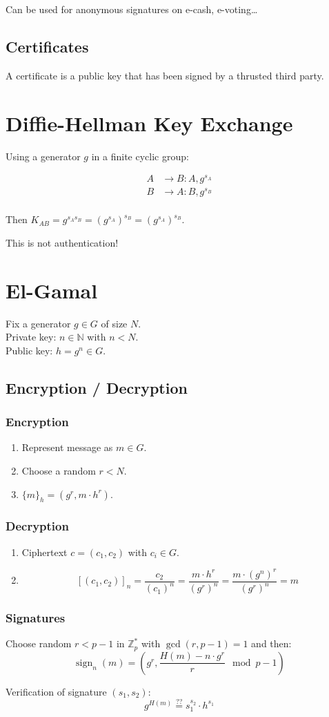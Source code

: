 \documentclass{article}
\newcommand{\ZZ}{\mathbb{Z}}
\newcommand{\Z}{\ZZ}
\begin{document}
Can be used for anonymous signatures on e-cash, e-voting\dots

\subsection{Certificates}
A certificate is a public key that has been signed by a thrusted third party.

\section{Diffie-Hellman Key Exchange}

Using a generator $g$ in a finite cyclic group:

\begin{align*}
  A &\longrightarrow B: A, g^{s_A} \\
  B &\longrightarrow A: B, g^{s_B} \\
\end{align*}

Then $K_{AB} = g^{s_A s_B} = (g^{s_A})^{s_B} = (g^{s_A})^{s_B}$.

This is not authentication!

\section{El-Gamal}
Fix a generator $g \in G$ of size $N$. \\
Private key: $n \in \mathbb{N}$ with $n < N$. \\
Public key: $h = g^n \in G$.

\subsection{Encryption / Decryption}
\subsubsection{Encryption}

\begin{enumerate}
  \item Represent message as $m \in G$.
  \item Choose a random $r < N$.
  \item $\{m\}_h = (g^r, m \cdot h^r)$.
\end{enumerate}

\subsubsection{Decryption}
\begin{enumerate}
  \item Ciphertext $c = (c_1,c_2)$ with $c_i \in G$.
  \item \[
      [(c_1, c_2)]_n = \frac{c_2}{(c_1)^n} = \frac{m \cdot h^r}{(g^r)^n} = \frac{m \cdot (g^n)^r}{(g^r)^n} = m
    \]
\end{enumerate}


\subsubsection{Signatures}

Choose random $r < p-1$ in $\Z^*_p$ with $\gcd(r,p-1) = 1$ and then:
\[
  \operatorname{sign}_n(m) = \left( g^r, \frac{H(m) - n \cdot g^r}{r} \mod p-1 \right)
\]

Verification of signature $(s_1, s_2)$:
\[
  g^{H(m)} \overset{??}{=} s_1^{s_2} \cdot h^{s_1}
\]
\end{document}

